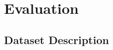 \documentclass[lettersize,journal]{IEEEtran}
\begin{document}


\section{Evaluation}
\label{section:case}

\subsection{Dataset Description}
\end{document}
